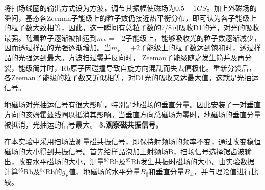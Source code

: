 \documentclass[UTF8]{ctexart}
\begin{document}
\begin{multicols}{2}
将扫场线圈的输出方式设为方波，调节其振幅使磁场为$0.5-1GS$。加上外磁场的瞬间，基态各Zeeman子能级上的粒子数仍接近热平衡分布，即可认为各子能级上的粒子数大致相等，因此，这一瞬间有总粒子数的7/8可吸收D1的光，对光的吸收最强。随着粒子逐渐被抽运到$m_F=+2$子能级上，能够吸收光的粒子数逐渐减少，因而透过样品的光强逐渐增加。当$m_F=+2$子能级上的粒子数达到饱和时，透过样品的光强达到最大。方波扫过零并反向时， Zeeman子能级随之发生简并及再分裂，能级简并时，Rb原子因碰撞导致自旋方向混乱而失去偏极化。重新分裂后，各Zeeman子能级的粒子数又近似相等，对D1光的吸收又达最大值。这就是光抽运信号。

地磁场对光抽运信号有很大影响，特别是地磁场的垂直分量。因此安装了一对垂直方向的亥姆霍兹线圈以抵消其影响。当垂直方向总磁场为零时，地磁场的垂直分量被抵消，光抽运的信号最大。
\newline\textbf{3.观察磁共振信号。}

在本实验中采用扫场法测量磁共振信号，即保持射频场的频率不变，通过改变稳恒磁场的大小得到共振信号。首先给样品泡加上射频场B，扫场信号选择锯齿波输出，改变水平磁场的大小，测量$^{87} \mathrm{Rb}$及$^{85} \mathrm{Rb}$发生共振时磁场的大小。由实验数据计算$^{85} \mathrm{Rb}$及$^{87} \mathrm{Rb}$的$g_F$值、地磁场的水平分量$B_{\|}$和垂直分量$B_{\perp}$，并与理论值进行比较。

\end{multicols}
\end{document}
